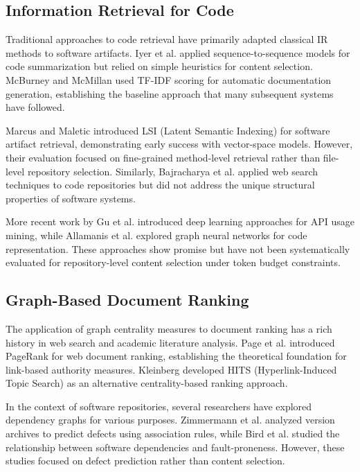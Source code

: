 \documentclass[conference]{IEEEtran}
\begin{document}
\subsection{Information Retrieval for Code}

Traditional approaches to code retrieval have primarily adapted classical IR methods to software artifacts. Iyer et al. \cite{iyer2016summarizing} applied sequence-to-sequence models for code summarization but relied on simple heuristics for content selection. McBurney and McMillan \cite{mcburney2014automatic} used TF-IDF scoring for automatic documentation generation, establishing the baseline approach that many subsequent systems have followed.

Marcus and Maletic \cite{marcus2003recovering} introduced LSI (Latent Semantic Indexing) for software artifact retrieval, demonstrating early success with vector-space models. However, their evaluation focused on fine-grained method-level retrieval rather than file-level repository selection. Similarly, Bajracharya et al. \cite{bajracharya2006mining} applied web search techniques to code repositories but did not address the unique structural properties of software systems.

More recent work by Gu et al. \cite{gu2016deep} introduced deep learning approaches for API usage mining, while Allamanis et al. \cite{allamanis2018learning} explored graph neural networks for code representation. These approaches show promise but have not been systematically evaluated for repository-level content selection under token budget constraints.

\subsection{Graph-Based Document Ranking}

The application of graph centrality measures to document ranking has a rich history in web search and academic literature analysis. Page et al. \cite{page1999pagerank} introduced PageRank for web document ranking, establishing the theoretical foundation for link-based authority measures. Kleinberg \cite{kleinberg1999authoritative} developed HITS (Hyperlink-Induced Topic Search) as an alternative centrality-based ranking approach.

In the context of software repositories, several researchers have explored dependency graphs for various purposes. Zimmermann et al. \cite{zimmermann2005mining} analyzed version archives to predict defects using association rules, while Bird et al. \cite{bird2011don} studied the relationship between software dependencies and fault-proneness. However, these studies focused on defect prediction rather than content selection.
\end{document}
